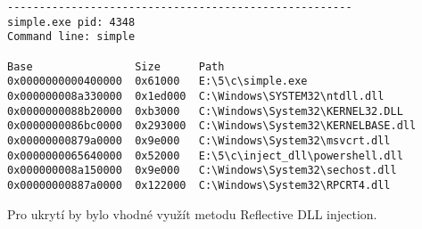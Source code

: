 \documentclass[12pt,a4paper]{article}
\begin{document}
\begin{enumerate}
\begin{enumerate}
\begin{verbatim}
------------------------------------------------------
simple.exe pid: 4348
Command line: simple

Base                Size      Path
0x0000000000400000  0x61000   E:\5\c\simple.exe
0x000000008a330000  0x1ed000  C:\Windows\SYSTEM32\ntdll.dll
0x0000000088b20000  0xb3000   C:\Windows\System32\KERNEL32.DLL
0x0000000086bc0000  0x293000  C:\Windows\System32\KERNELBASE.dll
0x00000000879a0000  0x9e000   C:\Windows\System32\msvcrt.dll
0x0000000065640000  0x52000   E:\5\c\inject_dll\powershell.dll
0x000000008a150000  0x9e000   C:\Windows\System32\sechost.dll
0x00000000887a0000  0x122000  C:\Windows\System32\RPCRT4.dll

\end{verbatim}

Pro ukrytí by bylo vhodné využít metodu Reflective DLL injection.

	\end{enumerate}
	
\end{enumerate}
\end{document}
